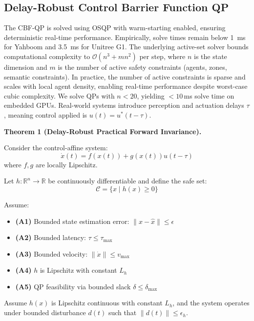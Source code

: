 \documentclass[10pt,twocolumn]{article}
\begin{document}
\subsection{Delay-Robust Control Barrier Function QP}
The CBF-QP is solved using OSQP with warm-starting enabled, ensuring deterministic real-time performance. Empirically, solve times remain below \SI{1}{\milli\second} for Yahboom and \SI{3.5}{\milli\second} for Unitree G1. The underlying active-set solver bounds computational complexity to $\mathcal{O}(n^3 + mn^2)$ per step, where $n$ is the state dimension and $m$ is the number of active safety constraints (agents, zones, semantic constraints). In practice, the number of active constraints is sparse and scales with local agent density, enabling real-time performance despite worst-case cubic complexity. We solve QPs with $n < 20$, yielding $<10$\,ms solve time on embedded GPUs. Real-world systems introduce perception and actuation delays $\tau$, meaning control applied is $u(t) = u^*(t - \tau)$.

\textbf{Theorem 1 (Delay-Robust Practical Forward Invariance).}

Consider the control-affine system:
\[
\dot{x}(t) = f(x(t)) + g(x(t))u(t - \tau)
\]
where $f, g$ are locally Lipschitz.

Let $h : \mathbb{R}^n \to \mathbb{R}$ be continuously differentiable and define the safe set:
\[
\mathcal{C} = \{x \mid h(x) \ge 0\}
\]

Assume:
\begin{itemize}
\item \textbf{(A1)} Bounded state estimation error: $\|x - \hat{x}\| \le \epsilon$
\item \textbf{(A2)} Bounded latency: $\tau \le \tau_{\max}$
\item \textbf{(A3)} Bounded velocity: $\|\dot{x}\| \le v_{\max}$
\item \textbf{(A4)} $h$ is Lipschitz with constant $L_h$
\item \textbf{(A5)} QP feasibility via bounded slack $\delta \le \delta_{\max}$
\end{itemize}

Assume $h(x)$ is Lipschitz continuous with constant $L_h$, and the system operates under bounded disturbance $d(t)$ such that $\|d(t)\| \le \epsilon_h$.
\end{document}
